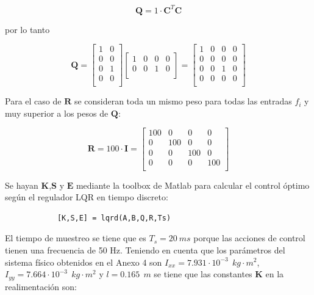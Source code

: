 \documentclass[twoside,11pt]{book}
\begin{document}
\begin{equation}
\mathbf{Q}=1 \cdot \pmb{C}^{T}\pmb{C}
\end{equation}

por lo tanto 

\begin{equation}
\mathbf{Q}= \left[ \begin{array}{cc}
1 & 0 \\
0 & 0 \\
0 & 1 \\
0 & 0 \\ \end{array} \right] \left[ \begin{array}{cccc}
1 & 0 & 0 & 0 \\
0 & 0 & 1 & 0 \\ \end{array} \right] = \left[ \begin{array}{cccc}
1 & 0 & 0 & 0 \\
0 & 0 & 0 & 0 \\
0 & 0 & 1 & 0 \\
0 & 0 & 0 & 0 \\ \end{array} \right]
\end{equation}

Para el caso de $\mathbf{R}$ se consideran toda un mismo peso para todas las entradas $f_i$ y muy superior a los pesos de $\mathbf{Q}$: 

\begin{equation}
\mathbf{R}=100 \cdot \pmb{I} = \left[ \begin{array}{cccc}
100 &   0 &   0 &   0 \\
0   & 100 &   0 &   0 \\
0   &   0 & 100 &   0 \\
0   &   0 &   0 & 100 \\ \end{array} \right] 
\end{equation}

Se hayan $\mathbf{K}$,$\mathbf{S}$ y $ \mathbf{E}$ mediante la toolbox de Matlab para calcular el control óptimo según el regulador LQR\cite{Toolbox_lqr} en tiempo discreto:

\begin{verbatim}
            [K,S,E] = lqrd(A,B,Q,R,Ts)
\end{verbatim}

El tiempo de muestreo se tiene que es $T_{s}=20\>ms$ porque las acciones de control tienen una frecuencia de 50 Hz. Teniendo en cuenta que los parámetros del sistema físico obtenidos en el Anexo 4 son $I_{xx}=7.931\cdot 10^{-3} \>\> kg \cdot m^{2}$, $I_{yy}=7.664\cdot 10^{-3}\>\> kg \cdot m^{2}$ y $l=0.165 \>\> m$ se tiene que las constantes $\mathbf{K}$ en la realimentación son:
\end{document}
